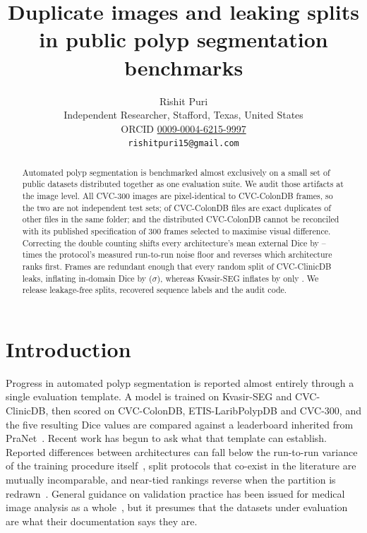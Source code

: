 \documentclass[11pt]{article}
\title{\textbf{Duplicate images and leaking splits in public polyp segmentation benchmarks}}
\author{Rishit Puri\\[2pt]
\normalsize Independent Researcher, Stafford, Texas, United States\\
\normalsize ORCID \href{https://orcid.org/0009-0004-6215-9997}{0009-0004-6215-9997}\\
\normalsize \texttt{rishitpuri15@gmail.com}}
\date{}
\begin{document}
\maketitle

\begin{abstract}
\noindent
Automated polyp segmentation is benchmarked almost exclusively on a small set
of public datasets distributed together as one evaluation suite. We audit
those artifacts at the image level. All \CVCThreeMatched{} CVC-300 images are
pixel-identical to CVC-ColonDB frames, so the two are not independent test
sets; \NDupesColon{} of \NColon{} CVC-ColonDB files are exact duplicates of
other files in the same folder; and the distributed CVC-ColonDB cannot be
reconciled with its published specification of 300 frames selected to
maximise visual difference. Correcting the double counting shifts every
architecture's mean external Dice by \RescoreMinSigma--\RescoreMaxSigma{}
times the protocol's measured run-to-run noise floor and reverses which
architecture ranks first. Frames are redundant enough that every random split
of CVC-ClinicDB leaks, inflating in-domain Dice by \InflationClinic{}
(\InflationClinicSigma$\sigma$), whereas Kvasir-SEG inflates by only
\InflationKvasir{}. We release leakage-free splits, recovered sequence labels
and the audit code.
\end{abstract}

\section*{Introduction}

Progress in automated polyp segmentation is reported almost entirely through a
single evaluation template. A model is trained on Kvasir-SEG and
CVC-ClinicDB, then scored on CVC-ColonDB, ETIS-LaribPolypDB and CVC-300, and
the five resulting Dice values are compared against a leaderboard inherited
from PraNet~\citep{fan2020pranet}. Recent work has begun to ask what that
template can establish. Reported differences between architectures can fall
below the run-to-run variance of the training procedure
itself~\citep{puri2026what}, split protocols that co-exist in the literature
are mutually incomparable, and near-tied rankings reverse when the partition
is redrawn~\citep{urooj2026metrics}. General guidance on validation practice
has been issued for medical image analysis as a
whole~\citep{maierhein2024metrics}, but it presumes that the datasets under
evaluation are what their documentation says they are.
\end{document}

